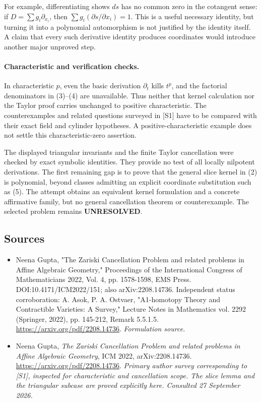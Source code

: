 \documentclass[11pt]{article}
\begin{document}
For example, differentiating shows $ds$ has no common zero in the
cotangent sense: if $D=\sum g_i\partial_{x_i}$, then
$\sum g_i(\partial s/\partial x_i)=1$. This is a useful necessary
identity, but turning it into a polynomial automorphism is not justified
by the identity itself. A claim that every such derivative identity
produces coordinates would introduce another major unproved step.

\paragraph{Characteristic and verification checks.}
In characteristic $p$, even the basic derivation $\partial_t$ kills
$t^p$, and the factorial denominators in (3)--(4) are unavailable.
Thus neither that kernel calculation nor the Taylor proof carries
unchanged to positive characteristic. The counterexamples and related
questions surveyed in [S1] have to be compared with their exact field
and cylinder hypotheses. A positive-characteristic example does not
settle this characteristic-zero assertion.

The displayed triangular invariants and the finite Taylor cancellation
were checked by exact symbolic identities. They provide no test of all
locally nilpotent derivations. The first remaining gap is to prove that
the general slice kernel in (2) is polynomial, beyond classes admitting
an explicit coordinate substitution such as (5). The attempt obtains
an equivalent kernel formulation and a concrete affirmative family,
but no general cancellation theorem or counterexample. The selected
problem remains \textbf{UNRESOLVED}.

\subsection{Sources}
\begin{itemize}
\item[S1]Neena Gupta, "The Zariski Cancellation Problem and related problems in Affine Algebraic Geometry," Proceedings of the International Congress of Mathematicians 2022, Vol. 4, pp. 1578-1598, EMS Press. DOI:10.4171/ICM2022/151; also arXiv:2208.14736. Independent status corroboration: A. Asok, P. A. Ostvaer, "A1-homotopy Theory and Contractible Varieties: A Survey," Lecture Notes in Mathematics vol. 2292 (Springer, 2022), pp. 145-212, Remark 5.5.1.5.
\url{https://arxiv.org/pdf/2208.14736}.
\textit{Formulation source.}
\item[E1]Neena Gupta, \emph{The Zariski Cancellation Problem and related
problems in Affine Algebraic Geometry}, ICM 2022, arXiv:2208.14736.
\url{https://arxiv.org/pdf/2208.14736}.
\textit{Primary author survey corresponding to [S1], inspected for
characteristic and cancellation scope. The slice lemma and the
triangular subcase are proved explicitly here.
Consulted 27 September 2026.}

\end{itemize}
\end{document}
